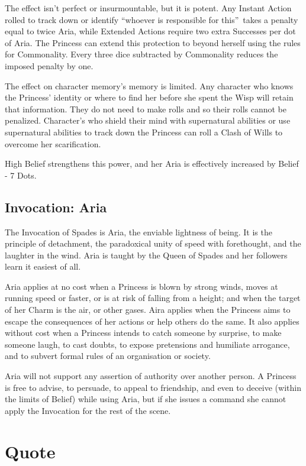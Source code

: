 The effect isn't perfect or insurmountable, but it is potent. Any Instant Action rolled to track down or identify \textquotedblleft whoever is responsible for this\textquotedblright\, takes a penalty equal to twice Aria, while Extended Actions require two extra Successes per dot of Aria. The Princess can extend this protection to beyond herself using the rules for Commonality. Every three dice subtracted by Commonality reduces the imposed penalty by one. 

The effect on character memory's memory is limited. Any character who knows the Princess' identity or where to find her before she spent the Wisp will retain that information. They do not need to make rolls and so their rolls cannot be penalized. Character's who shield their mind with supernatural abilities or use supernatural abilities to track down the Princess can roll a Clash of Wills to overcome her scarification. 

High Belief strengthens this power, and her Aria is effectively increased by Belief - 7 Dots.


\subsection*{Invocation: Aria}

The Invocation of Spades is Aria, the enviable lightness of being. It is the principle of detachment, the paradoxical unity of speed with forethought, and the laughter in the wind. Aria is taught by the Queen of Spades and her followers learn it easiest of all.

Aria applies at no cost when a Princess is blown by strong winds, moves at running speed or faster, or is at risk of falling from a height; and when the target of her Charm is the air, or other gases. Aira applies when the Princess aims to escape the consequences of her actions or help others do the same. It also applies without cost when a Princess intends to catch someone by surprise, to make someone laugh, to cast doubts, to expose pretensions and humiliate arrogance, and to subvert formal rules of an organisation or society.

Aria will not support any assertion of authority over another person. A Princess is free to advise, to persuade, to appeal to friendship, and even to deceive (within the limits of Belief) while using Aria, but if she issues a command she cannot apply the Invocation for the rest of the scene. 

\section*{Quote}


